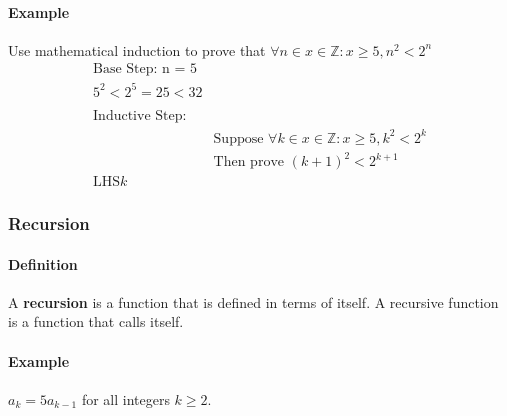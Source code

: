 \paragraph*{Example}
Use mathematical induction to prove that $\forall n \in {x \in \mathbb{Z} : x \geq 5}, n^2 < 2^n$
\begin{align*}
    \text{Base Step: n = 5}\\
    5^2 < 2^5 = 25 < 32\\
    \\
    \text{Inductive Step:}\\
    &\text{Suppose } \forall k \in {x \in \mathbb{Z} : x \geq 5}, k^2 < 2^k\\
    &\text{Then prove } (k+1)^2 < 2^{k+1}\\
    \text{LHS} k
\end{align*}

\subsubsection*{Recursion}
\paragraph*{Definition}
A \textbf{recursion} is a function that is defined in terms of itself. A recursive function is a function that calls itself.
\paragraph*{Example}
$a_k = 5a_{k-1}$ for all integers $k \geq 2$.
